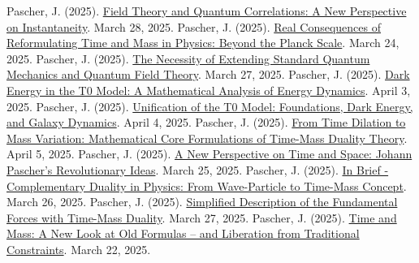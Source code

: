 \documentclass[12pt,a4paper]{article}
\begin{document}
\begin{thebibliography}{99}
		 Pascher, J. (2025). \href{https://github.com/jpascher/T0-Time-Mass-Duality/tree/main/2/pdf/English/FeldtheorieQuantenEn.pdf}{Field Theory and Quantum Correlations: A New Perspective on Instantaneity}. March 28, 2025.
		 Pascher, J. (2025). \href{https://github.com/jpascher/T0-Time-Mass-Duality/tree/main/2/pdf/English/JenseitsPlanckEn.pdf}{Real Consequences of Reformulating Time and Mass in Physics: Beyond the Planck Scale}. March 24, 2025.
		 Pascher, J. (2025). \href{https://github.com/jpascher/T0-Time-Mass-Duality/tree/main/2/pdf/English/NotwendigkeitQMErweiterungEn.pdf}{The Necessity of Extending Standard Quantum Mechanics and Quantum Field Theory}. March 27, 2025.
		 Pascher, J. (2025). \href{https://github.com/jpascher/T0-Time-Mass-Duality/tree/main/2/pdf/English/MathEnergiedynamikEn.pdf}{Dark Energy in the T0 Model: A Mathematical Analysis of Energy Dynamics}. April 3, 2025.
		 Pascher, J. (2025). \href{https://github.com/jpascher/T0-Time-Mass-Duality/tree/main/2/pdf/English/T0VereinheitlichungDEGalEn.pdf}{Unification of the T0 Model: Foundations, Dark Energy, and Galaxy Dynamics}. April 4, 2025.
		 Pascher, J. (2025). \href{https://github.com/jpascher/T0-Time-Mass-Duality/tree/main/2/pdf/English/MathZeitMasseLagrangeEn.pdf}{From Time Dilation to Mass Variation: Mathematical Core Formulations of Time-Mass Duality Theory}. April 5, 2025.
		 Pascher, J. (2025). \href{https://github.com/jpascher/T0-Time-Mass-Duality/tree/main/2/pdf/English/ZeitRaumPascherEn.pdf}{A New Perspective on Time and Space: Johann Pascher’s Revolutionary Ideas}. March 25, 2025.
		 Pascher, J. (2025). \href{https://github.com/jpascher/T0-Time-Mass-Duality/tree/main/2/pdf/English/KurzKomplementDualPhysikEn.pdf}{In Brief - Complementary Duality in Physics: From Wave-Particle to Time-Mass Concept}. March 26, 2025.
		 Pascher, J. (2025). \href{https://github.com/jpascher/T0-Time-Mass-Duality/tree/main/2/pdf/English/VierKraefteZeitMasseEn.pdf}{Simplified Description of the Fundamental Forces with Time-Mass Duality}. March 27, 2025.
		 Pascher, J. (2025). \href{https://github.com/jpascher/T0-Time-Mass-Duality/tree/main/2/pdf/English/ZeitMasseNeuerBlickEn.pdf}{Time and Mass: A New Look at Old Formulas – and Liberation from Traditional Constraints}. March 22, 2025.

\end{thebibliography}
\end{document}
